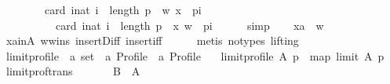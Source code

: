 \begin{isabellebody}
\ \ \ \ \ \ \ \ card\ {\isacharbraceleft}{\kern0pt}i{\isacharcolon}{\kern0pt}{\isacharcolon}{\kern0pt}nat{\isachardot}{\kern0pt}\ i\ {\isacharless}{\kern0pt}\ length\ p\ {\isasymand}\ {\isacharparenleft}{\kern0pt}w{\isacharcomma}{\kern0pt}\ x{\isacharparenright}{\kern0pt}\ {\isasymin}\ p{\isacharbang}{\kern0pt}i{\isacharbraceright}{\kern0pt}\ {\isacharless}{\kern0pt}\isanewline
\ \ \ \ \ \ \ \ \ \ card\ {\isacharbraceleft}{\kern0pt}i{\isacharcolon}{\kern0pt}{\isacharcolon}{\kern0pt}nat{\isachardot}{\kern0pt}\ i\ {\isacharless}{\kern0pt}\ length\ p\ {\isasymand}\ {\isacharparenleft}{\kern0pt}x{\isacharcomma}{\kern0pt}\ w{\isacharparenright}{\kern0pt}\ {\isasymin}\ p{\isacharbang}{\kern0pt}i{\isacharbraceright}{\kern0pt}{\isacharparenright}{\kern0pt}{\isachardoublequoteclose}\isanewline
\ \ \ \ \isamarkupfalse%
\ simp\isanewline
\ \ \isamarkupfalse%
\ {\isachardoublequoteopen}xa\ {\isacharequal}{\kern0pt}\ w{\isachardoublequoteclose}\isanewline
\ \ \ \ \isamarkupfalse%
\ xa{\isacharunderscore}{\kern0pt}in{\isacharunderscore}{\kern0pt}A\ w{\isacharunderscore}{\kern0pt}wins\ insert{\isacharunderscore}{\kern0pt}Diff\ insert{\isacharunderscore}{\kern0pt}iff\isanewline
\ \ \ \ \isamarkupfalse%
\ {\isacharparenleft}{\kern0pt}metis\ {\isacharparenleft}{\kern0pt}no{\isacharunderscore}{\kern0pt}types{\isacharcomma}{\kern0pt}\ lifting{\isacharparenright}{\kern0pt}{\isacharparenright}{\kern0pt}\isanewline
{}\isamarkupfalse%
%
\endisatagproof
{\isafoldproof}%
%
\isadelimproof
%
\endisadelimproof
%
\isadelimdocument
%
\endisadelimdocument
%
\isatagdocument
%
\isamarkuptrue%
%
\endisatagdocument
{\isafolddocument}%
%
\isadelimdocument
%
\endisadelimdocument
{}\isamarkupfalse%
\ limit{\isacharunderscore}{\kern0pt}profile\ {\isacharcolon}{\kern0pt}{\isacharcolon}{\kern0pt}\ {\isachardoublequoteopen}{\isacharprime}{\kern0pt}a\ set\ {\isasymRightarrow}\ {\isacharprime}{\kern0pt}a\ Profile\ {\isasymRightarrow}\ {\isacharprime}{\kern0pt}a\ Profile{\isachardoublequoteclose}\ \isanewline
\ \ {\isachardoublequoteopen}limit{\isacharunderscore}{\kern0pt}profile\ A\ p\ {\isacharequal}{\kern0pt}\ map\ {\isacharparenleft}{\kern0pt}limit\ A{\isacharparenright}{\kern0pt}\ p{\isachardoublequoteclose}\isanewline
\isanewline
{}\isamarkupfalse%
\ limit{\isacharunderscore}{\kern0pt}prof{\isacharunderscore}{\kern0pt}trans{\isacharcolon}{\kern0pt}\isanewline
\ \ \isanewline
\ \ \ \ {\isachardoublequoteopen}B\ {\isasymsubseteq}\ A{\isachardoublequoteclose}\ \isanewline

\end{isabellebody}
